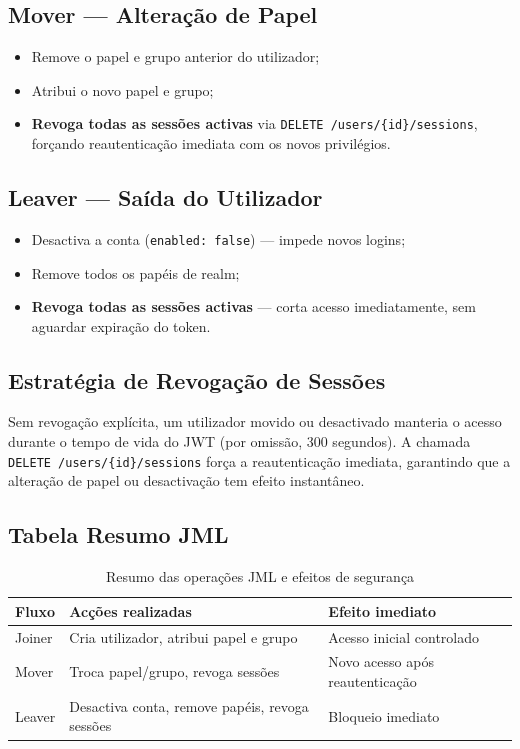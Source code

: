 \documentclass[12pt,a4paper]{article}
\begin{document}
\subsection{Mover — Alteração de Papel}

\begin{itemize}[leftmargin=1.5cm]
  \item Remove o papel e grupo anterior do utilizador;
  \item Atribui o novo papel e grupo;
  \item \textbf{Revoga todas as sessões activas} via \texttt{DELETE /users/\{id\}/sessions}, forçando reautenticação imediata com os novos privilégios.
\end{itemize}

\subsection{Leaver — Saída do Utilizador}

\begin{itemize}[leftmargin=1.5cm]
  \item Desactiva a conta (\texttt{enabled: false}) — impede novos logins;
  \item Remove todos os papéis de realm;
  \item \textbf{Revoga todas as sessões activas} — corta acesso imediatamente, sem aguardar expiração do token.
\end{itemize}

\subsection{Estratégia de Revogação de Sessões}

\begin{callout}
  Sem revogação explícita, um utilizador movido ou desactivado manteria o acesso durante o tempo de vida do JWT (por omissão, 300 segundos). A chamada \texttt{DELETE /users/\{id\}/sessions} força a reautenticação imediata, garantindo que a alteração de papel ou desactivação tem efeito instantâneo.
\end{callout}

\subsection{Tabela Resumo JML}

\begin{table}[H]
  \centering
  \caption{Resumo das operações JML e efeitos de segurança}
  \begin{tabularx}{\textwidth}{@{}lXl@{}}
    \toprule
    \textbf{Fluxo} & \textbf{Acções realizadas} & \textbf{Efeito imediato} \\
    \midrule
    Joiner & Cria utilizador, atribui papel e grupo & Acesso inicial controlado \\
    Mover & Troca papel/grupo, revoga sessões & Novo acesso após reautenticação \\
    Leaver & Desactiva conta, remove papéis, revoga sessões & Bloqueio imediato \\
    \bottomrule
  \end{tabularx}
\end{table}
\end{document}
